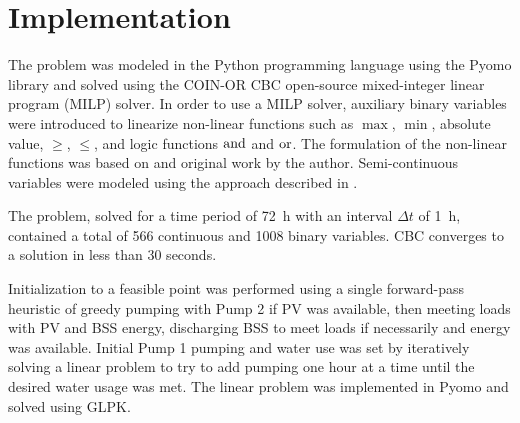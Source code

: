 \section{Implementation}
\label{sec:implementation}

The problem was modeled in the Python programming language using the Pyomo library\cite{hart2011pyomo,bynum2021pyomo} and solved using the COIN-OR CBC\cite{CBC} open-source mixed-integer linear program (MILP) solver. In order to use a MILP solver, auxiliary binary variables were introduced to linearize non-linear functions such as $\max$, $\min$, absolute value, $\ge$, $\le$, and logic functions $\operatorname{and}$ and $\operatorname{or}$. The formulation of the non-linear functions was based on \cite{YALPMIP_logic} and original work by the author. Semi-continuous variables were modeled using the approach described in \cite{MILP_handout}.

The problem, solved for a time period of \SI{72}{h} with an interval $\Delta t$ of \SI{1}{h}, contained a total of 566 continuous and 1008 binary variables. CBC converges to a solution in less than 30 seconds.

Initialization to a feasible point was performed using a single forward-pass heuristic of greedy pumping with Pump 2 if PV was available, then meeting loads with PV and BSS energy, discharging BSS to meet loads if necessarily and energy was available. Initial Pump 1 pumping and water use was set by iteratively solving a linear problem to try to add pumping one hour at a time until the desired water usage was met. The linear problem was implemented in Pyomo and solved using GLPK\cite{GLPK}.